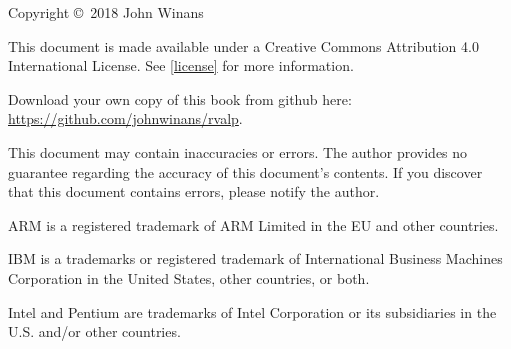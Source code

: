 \thispagestyle{plain}

Copyright \copyright\ 2018 John Winans 

This document is made available under a Creative Commons Attribution 4.0 
International License.  See \autoref{license} for more information.

Download your own copy of this book from github here: 
\url{https://github.com/johnwinans/rvalp}.

This document may contain inaccuracies or errors.  The author provides no 
guarantee regarding the accuracy of this document's contents.  If you 
discover that this document contains errors, please notify the author.



ARM\rtm{} is a registered trademark of ARM Limited in the 
EU and other countries.

IBM\rtm{} is a trademarks or registered trademark of International Business Machines 
Corporation in the United States, other countries, or both.

Intel\rtm{} and Pentium\rtm{} are trademarks of Intel Corporation or its subsidiaries 
in the U.S. and/or other countries.
